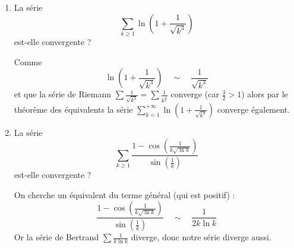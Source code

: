 \documentclass[class=report,crop=false]{standalone}
\begin{document}
\begin{exemple}
\begin{enumerate}
  \item La série 
  $$\sum_{k \ge 1} \ln\left(1+\frac{1}{\sqrt{k^3}}\right)$$ 
  est-elle convergente ?
  
  Comme
  $$\ln\left(1+\frac{1}{\sqrt{k^3}}\right) \quad \sim \quad \frac{1}{\sqrt{k^3}}$$
  et que la série de Riemann $\sum \frac{1}{\sqrt{k^3}}=\sum \frac{1}{k^{\frac32}}$ 
  converge (car $\frac32>1$) alors par le théorème des équivalents la série 
  $\sum_{k=1}^{+\infty} \ln\left(1+\frac{1}{\sqrt{k^3}}\right)$
  converge également.
  
  \item La série
$$\sum_{k \ge 1} 
\frac{1-\cos\left(\frac{1}{k\sqrt{\ln k}}\right)}{\sin\left(\frac{1}{k}\right)}$$
  est-elle convergente ?
  
On cherche un équivalent du terme général (qui est positif) :  
$$\frac{1-\cos\left(\frac{1}{k\sqrt{\ln k}}\right)}
{\sin\left(\frac{1}{k}\right)} \quad \sim \quad \frac{1}{2k\ln k}$$
Or la série de Bertrand $\sum \frac{1}{k\ln k}$ diverge, donc
notre série diverge aussi.
\end{enumerate}

\end{exemple}





\end{document}
